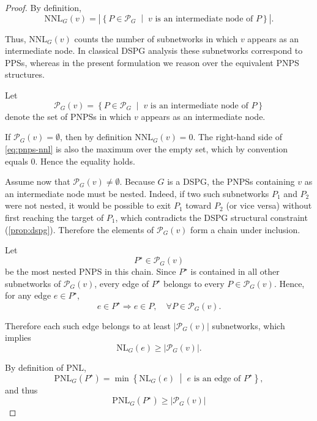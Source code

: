 \begin{proof}
By definition,
\[
\mathrm{NNL}_G(v)=
\left|
\left\{
P\in\mathcal{P}_G
\;\middle|\;
v \text{ is an intermediate node of } P
\right\}
\right|.
\]

Thus, $\mathrm{NNL}_G(v)$ counts the number of subnetworks in which $v$ appears as an intermediate node. In classical \ac{DSPG} analysis these subnetworks correspond to \acp{PPS}, whereas in the present formulation we reason over the equivalent \ac{PNPS} structures.

Let
\[
\mathcal{P}_G(v)=
\left\{
P\in\mathcal{P}_G
\;\middle|\;
v \text{ is an intermediate node of } P
\right\}
\]
denote the set of \acp{PNPS} in which $v$ appears as an intermediate node.

If $\mathcal{P}_G(v)=\emptyset$, then by definition $\mathrm{NNL}_G(v)=0$.
The right-hand side of \cref{eq:pnps-nnl} is also the maximum over the empty set,
which by convention equals $0$. Hence the equality holds.

Assume now that $\mathcal{P}_G(v)\neq\emptyset$.
Because $G$ is a \ac{DSPG}, the \acp{PNPS} containing $v$ as an intermediate node
must be nested. Indeed, if two such subnetworks $P_1$ and $P_2$ were not nested,
it would be possible to exit $P_1$ toward $P_2$ (or vice versa) without first
reaching the target of $P_1$, which contradicts the \ac{DSPG} structural constraint
(\cref{prop:dspg}). Therefore the elements of $\mathcal{P}_G(v)$ form a chain
under inclusion.

Let
\[
P^\star \in \mathcal{P}_G(v)
\]
be the most nested \ac{PNPS} in this chain. Since $P^\star$ is contained in
all other subnetworks of $\mathcal{P}_G(v)$, every edge of $P^\star$ belongs
to every $P \in \mathcal{P}_G(v)$. Hence, for any edge $e \in P^\star$,
\[
e \in P^\star \Rightarrow e \in P, \quad \forall P\in\mathcal{P}_G(v).
\]

Therefore each such edge belongs to at least $|\mathcal{P}_G(v)|$ subnetworks,
which implies
\[
\mathrm{NL}_G(e)\ge |\mathcal{P}_G(v)|.
\]

By definition of $\mathrm{PNL}$,
\begin{equation}
    \mathrm{PNL}_G(P^\star)
    =
    \min\left\{
    \mathrm{NL}_G(e)
    \;\middle|\;
    e \text{ is an edge of } P^\star
    \right\},
\end{equation}
and thus
\begin{equation}
    \label{eq:proof_nnl_1}
    \mathrm{PNL}_G(P^\star)\ge |\mathcal{P}_G(v)|
\end{equation}


\end{proof}
